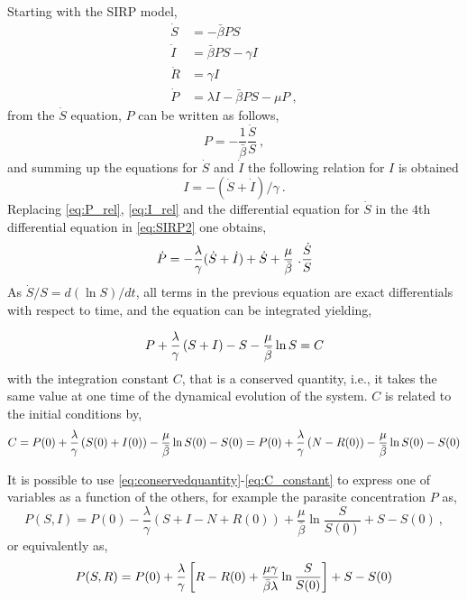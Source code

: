Starting with the SIRP model,
\begin{equation}\label{eq:SIRP2}
    \begin{aligned}
        \dot{S} & =-\bar{\beta} P S                    \\
        \dot{I} & =\bar{\beta} P S-\gamma I            \\
        \dot{R} & =\gamma I                            \\
        \dot{P} & =\lambda I-\bar{\beta}P S -\mu P \ ,
    \end{aligned}
\end{equation}
from the $\dot{S}$ equation, $P$ can be written as follows,
\begin{equation}\label{eq:P_rel}
    P=-\frac{1}{\bar{\beta}}\frac{\dot{S}}{S} \ ,
\end{equation}
and summing up the equations for $\dot{S}$ and $\dot{I}$ the following
relation for $I$ is obtained
\begin{equation}\label{eq:I_rel}
    I=-(\dot{S}+\dot{I})/\gamma \ .
\end{equation}
Replacing \cref{eq:P_rel}, \cref{eq:I_rel} and the differential equation
for $\dot{S}$ in the $4$th differential equation in \cref{eq:SIRP2} one
obtains,
\begin{equation}
    \dot{P}=-{{\lambda}\over{\gamma}} (\dot{S}+\dot{I})+\dot{S}+
    {{\mu}\over{\bar{\beta}}}\ . {{\dot{S}}\over{S}}
\end{equation}
As $\dot{S}/S=d(\ln S)/dt$, all terms in the previous equation are exact
differentials with respect to time, and the equation can be integrated
yielding,

\begin{equation}
    P + \frac{\lambda}{\gamma}\left(S+I\right)-S-\frac{\mu}{\bar{\beta}}\ln S=C
    \label{eq:conservedquantity}
\end{equation}
with the integration constant $C$,
that is a conserved quantity, i.e., it takes the same value at one time of
the dynamical evolution of the system.
$C$ is related to the initial conditions by,
\begin{equation}
    C = P(0)+\frac{\lambda}{\gamma}\left(S(0)+I(0)\right) -
    \frac{\mu}{\bar{\beta}}\ln{S(0)} -
    S(0)=P(0)+\frac{\lambda}{\gamma}\left(N-R(0)\right) -
    \frac{\mu}{\bar{\beta}}\ln{S(0)} - S(0)
    \label{eq:C_constant}
\end{equation}

It is possible to use \cref{eq:conservedquantity}-\cref{eq:C_constant} to
express one of variables as a function of the others, for example
the parasite concentration $P$ as,
\begin{equation} \label{eq:PSI_exact}
    P(S, I)=P(0)-\frac{\lambda}{\gamma}\left(S+I-N+R(0)\right)+
    \frac{\mu}{\bar{\beta}}\ln{\frac{S}{S(0)}} + S - S(0)\ ,
\end{equation}
or equivalently as,
\begin{equation}\label{eq:psrexact}
    P(S,R)=P(0) + \frac{\lambda}{\gamma}\left[R-R(0)+
        \frac{\mu\gamma}{\bar{\beta}\lambda}\ln{\frac{S}{S(0)}}\right] + S - S(0)
\end{equation}

